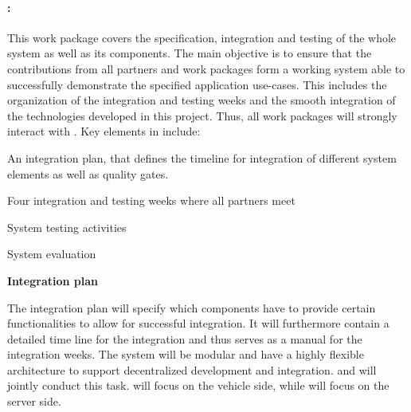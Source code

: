 
\paragraph{\WPIntegration: \WPIntegrationTitle \\}

{\noindent\wptablefont

\wptableheaderB{\WPIntegrationVW}{\WPIntegrationETHZ}{\WPIntegrationIBM}{\WPIntegrationCLUJ}{\WPIntegrationPRAGUE}



This work package covers the specification, integration and testing of the whole system as well as its components. The main objective is to ensure that the contributions from all partners and work packages form a working system able to successfully demonstrate the specified application use-cases. This includes the organization of the integration and testing weeks and the smooth integration of the technologies developed in this project. Thus, all work packages will strongly interact with \WPIntegration. Key elements in \WPIntegration include:
\begin{denseItemize}
\item An integration plan, that defines the timeline for integration of different system elements as well as quality gates.
\item Four integration and testing weeks where all partners meet 
\item System testing activities
\item System evaluation
\end{denseItemize}


\begin{tasks}{\WPIntegrationNo}

\item {\bf Integration plan}
\label{task:wpint:intplan}
\taskpartners{\VW}{\IBM}

The integration plan will specify which components have to provide certain functionalities to allow for successful integration. It will furthermore contain a detailed time line for the integration and thus serves as a manual for the integration weeks. The system will be modular and have a highly flexible architecture to support decentralized development and integration. \IBM{} and \VW{} will jointly conduct this task. \VW{} will focus on the vehicle side, while \IBM{} will focus on the server side.


\end{tasks}}
